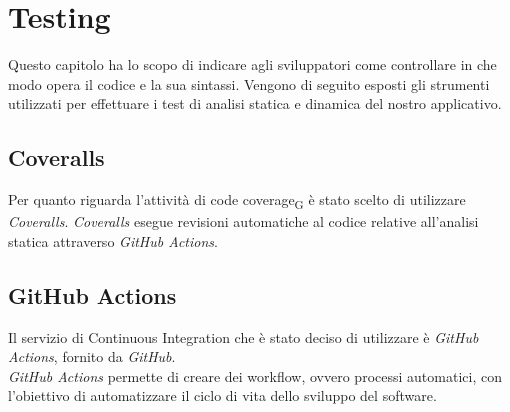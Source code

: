 \section{Testing}
Questo capitolo ha lo scopo di indicare agli sviluppatori come controllare in che modo opera il codice e la sua sintassi. Vengono di seguito esposti gli strumenti utilizzati per effettuare i test di analisi statica e dinamica del nostro applicativo.

\subsection{Coveralls}
Per quanto riguarda l'attività di code coverage\textsubscript{G} è stato scelto di utilizzare \textit{Coveralls}. \textit{Coveralls} esegue revisioni automatiche al codice relative all'analisi statica attraverso \textit{GitHub Actions}.

\subsection{GitHub Actions}
Il servizio di Continuous Integration che è stato deciso di utilizzare è \textit{GitHub Actions}, fornito da \textit{GitHub}. \\\textit{GitHub Actions} permette di creare dei workflow, ovvero processi automatici, con l'obiettivo di automatizzare il ciclo di vita dello sviluppo del software.




